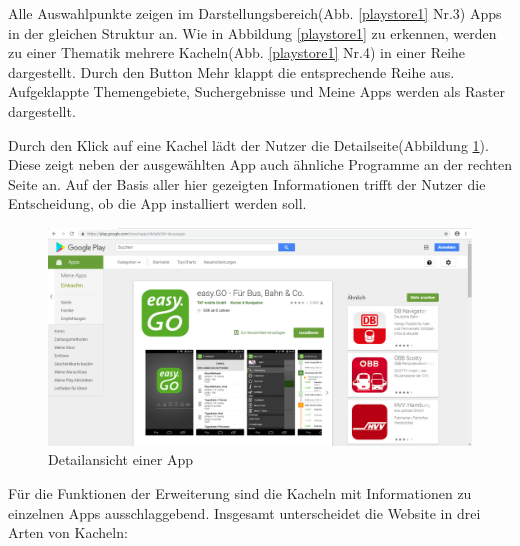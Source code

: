 Alle Auswahlpunkte zeigen im Darstellungsbereich(Abb. \ref{playstore1} Nr.3) Apps in der gleichen Struktur an. Wie in Abbildung \ref{playstore1} zu erkennen, werden zu einer Thematik mehrere Kacheln(Abb. \ref{playstore1} Nr.4) in einer Reihe dargestellt. Durch den Button \glqq Mehr\grqq{} klappt die entsprechende Reihe aus. Aufgeklappte Themengebiete, Suchergebnisse und \glqq Meine Apps\grqq{} werden als Raster dargestellt.

Durch den Klick auf eine Kachel lädt der Nutzer die Detailseite(Abbildung \ref{playstore2}). Diese zeigt neben der ausgewählten App auch ähnliche Programme an der rechten Seite an. Auf der Basis aller hier gezeigten Informationen trifft der Nutzer die Entscheidung, ob die App installiert werden soll.

\begin{figure}[ht]
	\centering
	\includegraphics[width=1\textwidth]{pics/playstore2.png}
	\caption{Detailansicht einer App}
	\label{playstore2}
\end{figure}

Für die Funktionen der Erweiterung sind die Kacheln mit Informationen zu einzelnen Apps ausschlaggebend. Insgesamt unterscheidet die Website in drei Arten von Kacheln:

